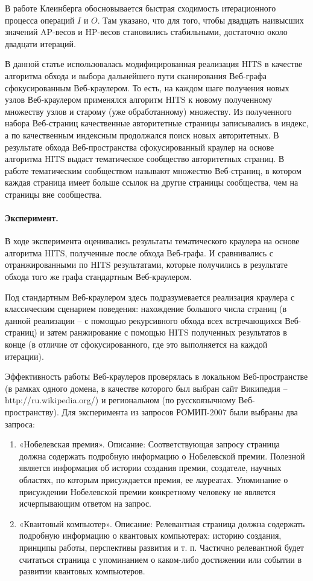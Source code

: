 В работе Клеинберга \cite{Kleinberg} обосновывается быстрая сходимость итерационного процесса операций \(I\) и \(O\). Там указано, что для того, чтобы двадцать наивысших значений AP-весов и HP-весов становились стабильными, достаточно около двадцати итераций.

В данной статье использовалась модифицированная реализация HITS в качестве алгоритма обхода и выбора дальнейшего пути сканирования Веб-графа сфокусированным Веб-краулером. То есть, на каждом шаге получения новых узлов Веб-краулером применялся алгоритм HITS к новому полученному множеству узлов и старому (уже обработанному) множеству. Из полученного набора Веб-страниц качественные авторитетные страницы записывались в индекс, а по качественным индексным продолжался поиск новых авторитетных. В результате обхода Веб-пространства сфокусированный краулер на основе алгоритма HITS выдаст тематическое сообщество авторитетных страниц. В работе \cite{GibsonKleinbergRaghavan} тематическим сообществом называют множество Веб-страниц, в котором каждая страница имеет больше ссылок на другие страницы сообщества, чем на страницы вне сообщества.

\paragraph{Эксперимент.} В ходе эксперимента оценивались результаты тематического краулера на основе алгоритма HITS, полученные после обхода Веб-графа. И сравнивались с отранжированными по HITS результатами, которые получились в результате обхода того же графа стандартным Веб-краулером.

Под стандартным Веб-краулером здесь подразумевается реализация краулера с классическим сценарием поведения: нахождение большого числа страниц (в данной реализации -- с помощью рекурсивного обхода всех встречающихся Веб-страниц) и затем ранжирование с помощью HITS полученных результатов в конце (в отличие от сфокусированного, где это выполняется на каждой итерации).

Эффективность работы Веб-краулеров проверялась в локальном Веб-пространстве (в рамках одного домена, в качестве которого был выбран сайт Википедия -- http://ru.wikipedia.org/) и региональном (по русскоязычному Веб-пространству). Для эксперимента из запросов РОМИП-2007 были выбраны два запроса:

\begin{enumerate}
	\item «Нобелевская премия». Описание: Соответствующая запросу страница должна содержать подробную информацию о Нобелевской премии. Полезной является информация об истории создания премии, создателе, научных областях, по которым присуждается премия, ее лауреатах. Упоминание о присуждении Нобелевской премии конкретному человеку не является исчерпывающим ответом на запрос.
	\item «Квантовый компьютер». Описание: Релевантная страница должна содержать подробную информацию о квантовых компьютерах: историю создания, принципы работы, перспективы развития и т. п. Частично релевантной будет считаться страница с упоминанием о каком-либо достижении или событии в развитии квантовых компьютеров.
\end{enumerate}

